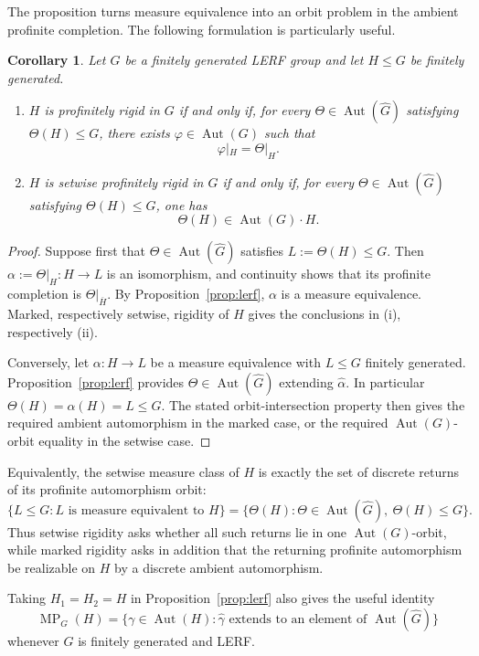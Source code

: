 \documentclass[11pt]{amsart}
\theoremstyle{plain}
\newtheorem{corollary}[theorem]{Corollary}
\theoremstyle{definition}
\newcommand{\Aut}{\operatorname{Aut}}
\newcommand{\MP}{\operatorname{MP}}
\begin{document}
The proposition turns measure equivalence into an orbit problem in the ambient
profinite completion.  The following formulation is particularly useful.
\begin{corollary}\label{cor:orbit-intersection}
Let $G$ be a finitely generated LERF group and let $H\le G$ be finitely
generated.
\begin{enumerate}
\item[(i)] $H$ is profinitely rigid in $G$ if and only if, for every
$\Theta\in\Aut(\widehat G)$ satisfying $\Theta(H)\le G$, there exists
$\varphi\in\Aut(G)$ such that
\[
  \varphi|_H=\Theta|_H.
\]
\item[(ii)] $H$ is setwise profinitely rigid in $G$ if and only if, for every
$\Theta\in\Aut(\widehat G)$ satisfying $\Theta(H)\le G$, one has
\[
  \Theta(H)\in\Aut(G)\cdot H.
\]
\end{enumerate}
\end{corollary}
\begin{proof}
Suppose first that $\Theta\in\Aut(\widehat G)$ satisfies $L:=\Theta(H)\le G$.
Then $\alpha:=\Theta|_H\colon H\to L$ is an isomorphism, and continuity shows
that its profinite completion is $\Theta|_{\overline H}$.  By
Proposition~\ref{prop:lerf}, $\alpha$ is a measure equivalence.  Marked,
respectively setwise, rigidity of $H$ gives the conclusions in (i),
respectively (ii).

Conversely, let $\alpha\colon H\to L$ be a measure equivalence with $L\le G$
finitely generated.  Proposition~\ref{prop:lerf} provides
$\Theta\in\Aut(\widehat G)$ extending $\widehat\alpha$.  In particular
$\Theta(H)=\alpha(H)=L\le G$.  The stated orbit-intersection property then
gives the required ambient automorphism in the marked case, or the required
$\Aut(G)$-orbit equality in the setwise case.
\end{proof}

Equivalently, the setwise measure class of $H$ is exactly the set of discrete
returns of its profinite automorphism orbit:
\begin{equation}\label{eq:measure-class-return}
  \{L\le G:L\text{ is measure equivalent to }H\}
  =\{\Theta(H):\Theta\in\Aut(\widehat G),\ \Theta(H)\le G\}.
\end{equation}
Thus setwise rigidity asks whether all such returns lie in one
$\Aut(G)$-orbit, while marked rigidity asks in addition that the returning
profinite automorphism be realizable on $H$ by a discrete ambient
automorphism.

Taking $H_1=H_2=H$ in Proposition~\ref{prop:lerf} also gives the useful
identity
\begin{equation}\label{eq:MP-profinite}
  \MP_G(H)=\{\gamma\in\Aut(H):\widehat\gamma\text{ extends to an element of }
  \Aut(\widehat G)\}
\end{equation}
whenever $G$ is finitely generated and LERF.
\end{document}
